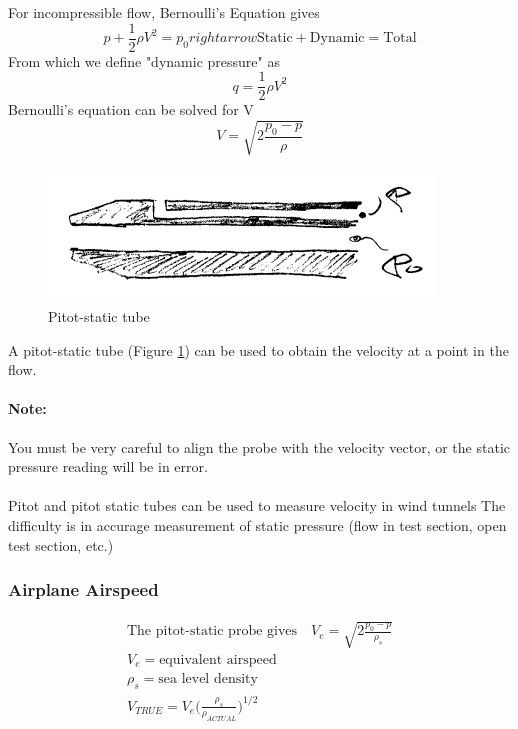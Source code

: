 \documentclass[draft=false, titlepage]{article}
\begin{document}
For incompressible flow, Bernoulli's Equation gives
\begin{equation*}
p + \frac{1}{2}\rho V^2 = p_0 rightarrow \text{Static} + \text{Dynamic} = \text{Total}
\end{equation*}
From which we define "dynamic pressure" as
\begin{equation}
q = \frac{1}{2}\rho V^2
\label{eq:dynamicPressure}
\end{equation}
Bernoulli's equation can be solved for V
\begin{equation}
\boxed{V = \sqrt{2\frac{p_0-p}{\rho}}}
\label{eq:vFromBernoulli}
\end{equation}
\begin{figure}[ht]
	\centering
	\includegraphics[width=0.4\linewidth]{Figures/p12_pitotStatic.PNG}
	\caption{Pitot-static tube}
	\label{fig:p12_pitotStatic}
\end{figure}
A pitot-static tube (Figure \ref{fig:p12_pitotStatic}) can be used to obtain the velocity at a point in the flow.
\paragraph*{Note:} You must be very careful to align the probe with the velocity vector, or the static pressure reading will be in error.
\paragraph*{} Pitot and pitot static tubes can be used to measure velocity in wind tunnels The difficulty is in accurage measurement of static pressure (flow in test section, open test section, etc.) %

\subsubsection{Airplane Airspeed}
\begin{gather*}
\text{The pitot-static probe gives} \quad V_e = \sqrt{2\frac{p_0-p}{\rho_s}}\\
V_e = \text{equivalent airspeed}\\
\rho_s = \text{sea level density}\\
V_{TRUE} = V_e \big( \frac{\rho_s}{\rho_{ACTUAL}} \big)^{1/2}
\end{gather*}
\end{document}
